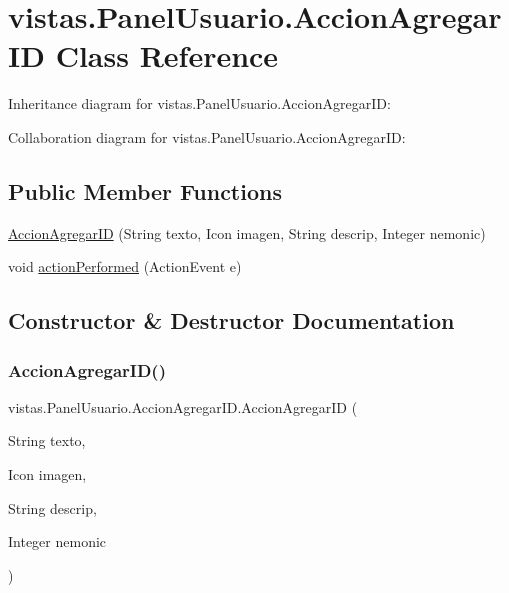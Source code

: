 \hypertarget{classvistas_1_1_panel_usuario_1_1_accion_agregar_i_d}{}\section{vistas.\+Panel\+Usuario.\+Accion\+Agregar\+ID Class Reference}
\label{classvistas_1_1_panel_usuario_1_1_accion_agregar_i_d}


Inheritance diagram for vistas.\+Panel\+Usuario.\+Accion\+Agregar\+ID\+:


Collaboration diagram for vistas.\+Panel\+Usuario.\+Accion\+Agregar\+ID\+:
\subsection*{Public Member Functions}
\begin{DoxyCompactItemize}
\item 
\mbox{\hyperlink{classvistas_1_1_panel_usuario_1_1_accion_agregar_i_d_ad241a5ec2a2a9f7a084de6d6b085b16e}{Accion\+Agregar\+ID}} (String texto, Icon imagen, String descrip, Integer nemonic)
\item 
void \mbox{\hyperlink{classvistas_1_1_panel_usuario_1_1_accion_agregar_i_d_af6201c55723abc3b5517c8a18b18faa7}{action\+Performed}} (Action\+Event e)
\end{DoxyCompactItemize}


\subsection{Constructor \& Destructor Documentation}
\mbox{\label{classvistas_1_1_panel_usuario_1_1_accion_agregar_i_d_ad241a5ec2a2a9f7a084de6d6b085b16e}} 
\subsubsection{\texorpdfstring{Accion\+Agregar\+I\+D()}{AccionAgregarID()}}
{\footnotesize\ttfamily vistas.\+Panel\+Usuario.\+Accion\+Agregar\+I\+D.\+Accion\+Agregar\+ID (\begin{DoxyParamCaption}\item[{String}]{texto,  }\item[{Icon}]{imagen,  }\item[{String}]{descrip,  }\item[{Integer}]{nemonic }\end{DoxyParamCaption})\hspace{0.3cm}{\ttfamily [inline]}}


